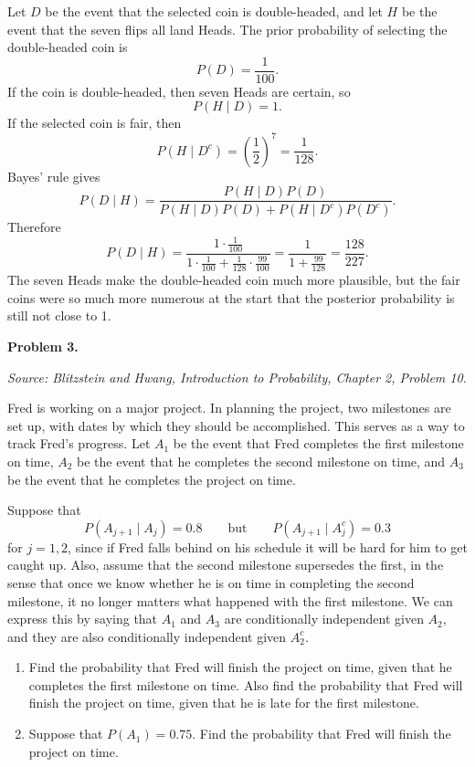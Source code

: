 \documentclass[11pt]{article}
\newcommand{\source}[1]{%
    \vspace{0.15cm}
    {\small\textit{Source: Blitzstein and Hwang, \textit{Introduction to Probability}, Chapter 2, Problem #1.}}
}
\begin{document}
\begin{solutionbox}
Let $D$ be the event that the selected coin is double-headed, and let $H$ be the event that the seven flips all land Heads. The prior probability of selecting the double-headed coin is
\[
P(D)=\frac{1}{100}.
\]
If the coin is double-headed, then seven Heads are certain, so
\[
P(H\mid D)=1.
\]
If the selected coin is fair, then
\[
P(H\mid D^c)=\left(\frac12\right)^7=\frac{1}{128}.
\]
Bayes' rule gives
\[
P(D\mid H)
=
\frac{P(H\mid D)P(D)}{P(H\mid D)P(D)+P(H\mid D^c)P(D^c)}.
\]
Therefore
\[
P(D\mid H)
=
\frac{1\cdot \frac{1}{100}}{1\cdot \frac{1}{100}+\frac{1}{128}\cdot \frac{99}{100}}
=
\frac{1}{1+\frac{99}{128}}
=
\frac{128}{227}.
\]
The seven Heads make the double-headed coin much more plausible, but the fair coins were so much more numerous at the start that the posterior probability is still not close to 1.

\end{solutionbox}
\newpage


\begin{problemheader}
\textbf{Problem 3.}
\end{problemheader}
\source{10}

Fred is working on a major project. In planning the project, two milestones are set up, with dates by which they should be accomplished. This serves as a way to track Fred's progress. Let $A_1$ be the event that Fred completes the first milestone on time, $A_2$ be the event that he completes the second milestone on time, and $A_3$ be the event that he completes the project on time.

Suppose that
\[
P(A_{j+1}\mid A_j)=0.8
\qquad\text{but}\qquad
P(A_{j+1}\mid A_j^c)=0.3
\]
for $j=1,2$, since if Fred falls behind on his schedule it will be hard for him to get caught up. Also, assume that the second milestone supersedes the first, in the sense that once we know whether he is on time in completing the second milestone, it no longer matters what happened with the first milestone. We can express this by saying that $A_1$ and $A_3$ are conditionally independent given $A_2$, and they are also conditionally independent given $A_2^c$.

\begin{enumerate}[label=(\alph*), leftmargin=*]
    \item Find the probability that Fred will finish the project on time, given that he completes the first milestone on time. Also find the probability that Fred will finish the project on time, given that he is late for the first milestone.

    \item Suppose that $P(A_1)=0.75$. Find the probability that Fred will finish the project on time.
\end{enumerate}
\end{document}
